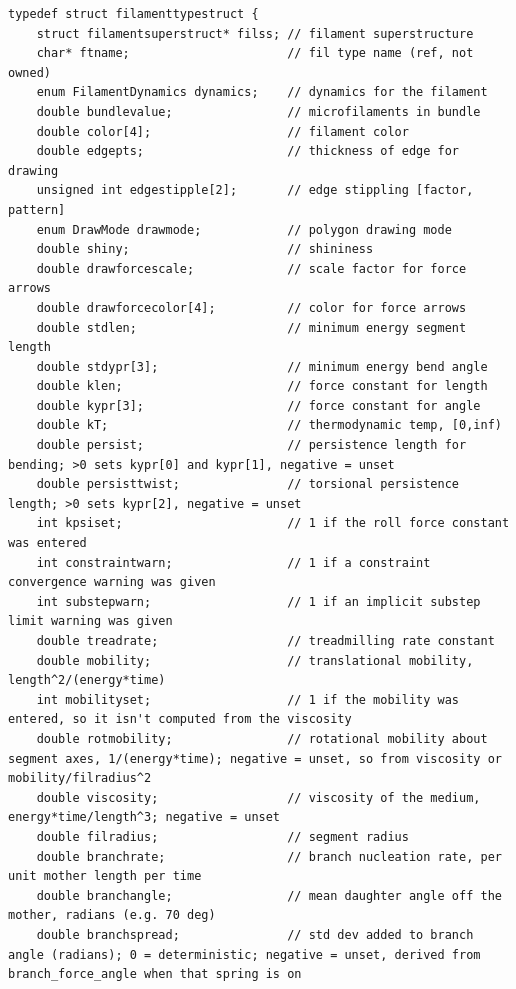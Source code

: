 \documentclass {scrbook}
\begin{document}
\begin{lstlisting}
typedef struct filamenttypestruct {
    struct filamentsuperstruct* filss; // filament superstructure
    char* ftname;                      // fil type name (ref, not owned)
    enum FilamentDynamics dynamics;    // dynamics for the filament
    double bundlevalue;                // microfilaments in bundle
    double color[4];                   // filament color
    double edgepts;                    // thickness of edge for drawing
    unsigned int edgestipple[2];       // edge stippling [factor, pattern]
    enum DrawMode drawmode;            // polygon drawing mode
    double shiny;                      // shininess
    double drawforcescale;             // scale factor for force arrows
    double drawforcecolor[4];          // color for force arrows
    double stdlen;                     // minimum energy segment length
    double stdypr[3];                  // minimum energy bend angle
    double klen;                       // force constant for length
    double kypr[3];                    // force constant for angle
    double kT;                         // thermodynamic temp, [0,inf)
    double persist;                    // persistence length for bending; >0 sets kypr[0] and kypr[1], negative = unset
    double persisttwist;               // torsional persistence length; >0 sets kypr[2], negative = unset
    int kpsiset;                       // 1 if the roll force constant was entered
    int constraintwarn;                // 1 if a constraint convergence warning was given
    int substepwarn;                   // 1 if an implicit substep limit warning was given
    double treadrate;                  // treadmilling rate constant
    double mobility;                   // translational mobility, length^2/(energy*time)
    int mobilityset;                   // 1 if the mobility was entered, so it isn't computed from the viscosity
    double rotmobility;                // rotational mobility about segment axes, 1/(energy*time); negative = unset, so from viscosity or mobility/filradius^2
    double viscosity;                  // viscosity of the medium, energy*time/length^3; negative = unset
    double filradius;                  // segment radius
    double branchrate;                 // branch nucleation rate, per unit mother length per time
    double branchangle;                // mean daughter angle off the mother, radians (e.g. 70 deg)
    double branchspread;               // std dev added to branch angle (radians); 0 = deterministic; negative = unset, derived from branch_force_angle when that spring is on

\end{lstlisting}
\end{document}
